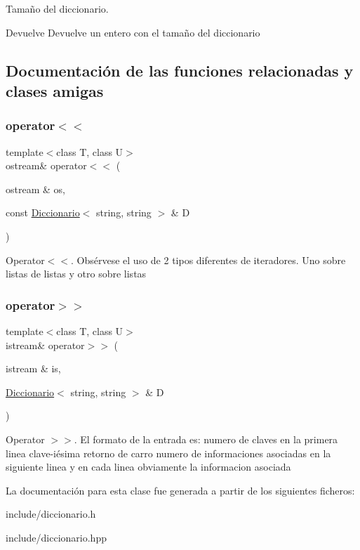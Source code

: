 Tamaño del diccionario. 

\begin{DoxyReturn}{Devuelve}
Devuelve un entero con el tamaño del diccionario 
\end{DoxyReturn}


\subsection{Documentación de las funciones relacionadas y clases amigas}
\mbox{\label{classDiccionario_a2df23b649675001c9287783c5ba5de7f}} 
\subsubsection{\texorpdfstring{operator$<$$<$}{operator<<}}
{\footnotesize\ttfamily template$<$class T, class U$>$ \\
ostream\& operator$<$$<$ (\begin{DoxyParamCaption}\item[{ostream \&}]{os,  }\item[{const \hyperlink{classDiccionario}{Diccionario}$<$ string, string $>$ \&}]{D }\end{DoxyParamCaption})\hspace{0.3cm}{\ttfamily [friend]}}

Operator$<$$<$. Obsérvese el uso de 2 tipos diferentes de iteradores. Uno sobre listas de listas y otro sobre listas \mbox{\label{classDiccionario_ad641af7266310b3ad1491ba4268cbb79}} 
\subsubsection{\texorpdfstring{operator$>$$>$}{operator>>}}
{\footnotesize\ttfamily template$<$class T, class U$>$ \\
istream\& operator$>$$>$ (\begin{DoxyParamCaption}\item[{istream \&}]{is,  }\item[{\hyperlink{classDiccionario}{Diccionario}$<$ string, string $>$ \&}]{D }\end{DoxyParamCaption})\hspace{0.3cm}{\ttfamily [friend]}}

Operator $>$$>$. El formato de la entrada es\+: numero de claves en la primera linea clave-\/iésima retorno de carro numero de informaciones asociadas en la siguiente linea y en cada linea obviamente la informacion asociada 

La documentación para esta clase fue generada a partir de los siguientes ficheros\+:\begin{DoxyCompactItemize}
\item 
include/diccionario.\+h\item 
include/diccionario.\+hpp\end{DoxyCompactItemize}
